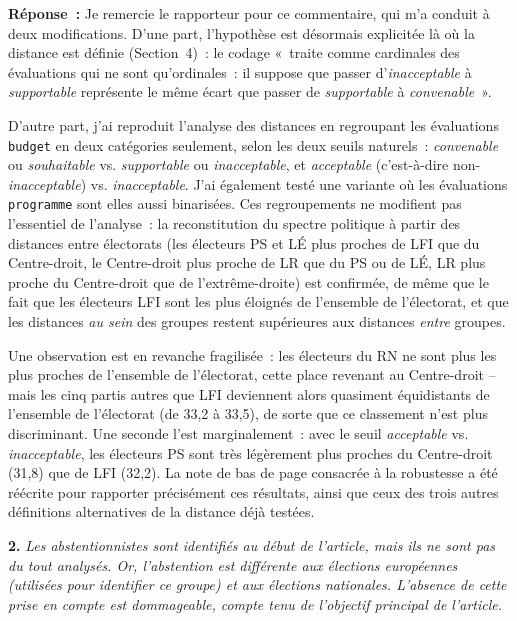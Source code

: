 \documentclass[12pt,french]{article}
\newcommand{\reponse}[1]{\medskip\par\noindent\textbf{Réponse~:} #1\par\medskip}
\begin{document}
\reponse{Je remercie le rapporteur pour ce commentaire, qui m'a conduit à deux modifications. D'une part, l'hypothèse est désormais explicitée là où la distance est définie (Section~4)~: le codage «~traite comme cardinales des évaluations qui ne sont qu'ordinales~: il suppose que passer d'\textit{inacceptable} à \textit{supportable} représente le même écart que passer de \textit{supportable} à \textit{convenable}~».

D'autre part, j'ai reproduit l'analyse des distances en regroupant les évaluations \texttt{budget} en deux catégories seulement, selon les deux seuils naturels~: \textit{convenable} ou \textit{souhaitable} vs. \textit{supportable} ou \textit{inacceptable}, et \textit{acceptable} (c'est-à-dire non-\textit{inacceptable}) vs. \textit{inacceptable}. J'ai également testé une variante où les évaluations \texttt{programme} sont elles aussi binarisées. Ces regroupements ne modifient pas l'essentiel de l'analyse~: la reconstitution du spectre politique à partir des distances entre électorats (les électeurs PS et LÉ plus proches de LFI que du Centre-droit, le Centre-droit plus proche de LR que du PS ou de LÉ, LR plus proche du Centre-droit que de l'extrême-droite) est confirmée, de même que le fait que les électeurs LFI sont les plus éloignés de l'ensemble de l'électorat, et que les distances \textit{au sein} des groupes restent supérieures aux distances \textit{entre} groupes.

Une observation est en revanche fragilisée~: les électeurs du RN ne sont plus les plus proches de l'ensemble de l'électorat, cette place revenant au Centre-droit -- mais les cinq partis autres que LFI deviennent alors quasiment équidistants de l'ensemble de l'électorat (de 33,2 à 33,5), de sorte que ce classement n'est plus discriminant. Une seconde l'est marginalement~: avec le seuil \textit{acceptable} vs. \textit{inacceptable}, les électeurs PS sont très légèrement plus proches du Centre-droit (31,8) que de LFI (32,2). La note de bas de page consacrée à la robustesse a été réécrite pour rapporter précisément ces résultats, ainsi que ceux des trois autres définitions alternatives de la distance déjà testées.}



\bigskip
\noindent\textbf{2.} \textit{Les abstentionnistes sont identifiés au début de l'article, mais ils ne sont pas du tout analysés. Or, l'abstention est différente aux élections européennes (utilisées pour identifier ce groupe) et aux élections nationales. L'absence de cette prise en compte est dommageable, compte tenu de l'objectif principal de l'article.}
\end{document}
